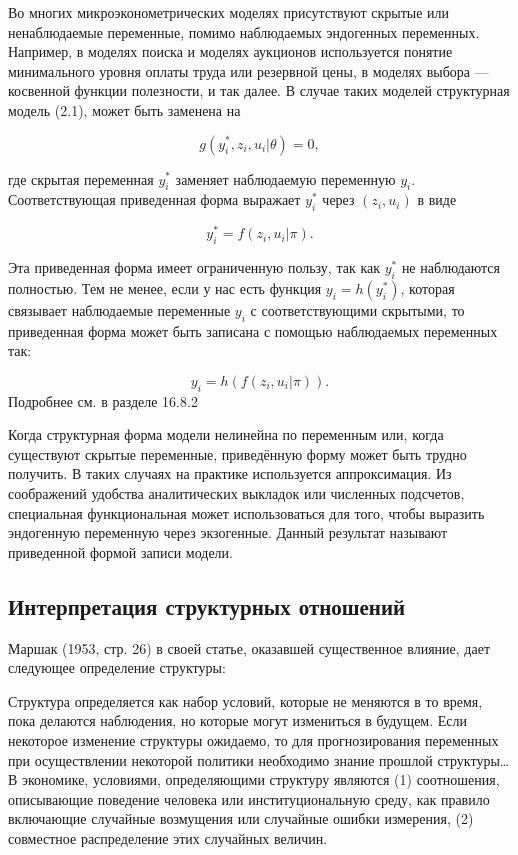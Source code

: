 Во многих микроэконометрических моделях присутствуют скрытые или ненаблюдаемые переменные, помимо наблюдаемых эндогенных переменных. Например, в моделях поиска и моделях аукционов используется понятие минимального уровня оплаты труда или резервной цены, в моделях выбора --- косвенной функции полезности, и так далее. В случае таких моделей структурная модель (2.1), может быть заменена на

\begin{equation}
g(y^{\ast}_{i},z_{i},u_{i}|\theta)=0,
\end{equation}

где скрытая переменная $y^{\ast}_{i}$ заменяет наблюдаемую переменную $y_{i}$. Соответствующая приведенная форма выражает $y^{\ast}_{i}$ через $(z_{i},u_{i})$ в виде

\begin{equation}
y^{\ast}_{i}=f(z_{i},u_{i}|\pi).
\end{equation}


Эта приведенная форма имеет ограниченную пользу, так как $y^{\ast}_{i}$ не наблюдаются полностью. Тем не менее, если у нас есть функция $y_{i}=h(y^{\ast}_{i})$, которая связывает  наблюдаемые  переменные $y_{i}$ с соответствующими скрытыми, то приведенная форма может быть записана с помощью  наблюдаемых переменных  так:

\begin{equation}
y_{i}=h(f(z_{i},u_{i}|\pi)).
\end{equation}
Подробнее см. в разделе 16.8.2


Когда структурная форма модели  нелинейна по  переменным или, когда существуют скрытые переменные, приведённую форму может быть  трудно получить. В таких случаях на практике используется аппроксимация. Из соображений удобства аналитических выкладок или численных подсчетов, специальная функциональная может использоваться для того, чтобы выразить эндогенную переменную через  экзогенные. Данный результат называют приведенной формой записи модели.  



\subsection{Интерпретация структурных отношений}


Маршак (1953, стр. 26) в своей статье, оказавшей существенное влияние, дает следующее определение структуры: 


Структура определяется как набор условий, которые не меняются в то время, пока делаются наблюдения, но которые могут измениться в будущем. Если некоторое изменение структуры ожидаемо, то для прогнозирования переменных при осуществлении некоторой политики необходимо  знание прошлой структуры\ldots 
В экономике, условиями, определяющими структуру являются (1) соотношения, описывающие поведение человека или институциональную среду, как правило включающие случайные возмущения или случайные ошибки измерения, (2) совместное распределение этих случайных величин. 



